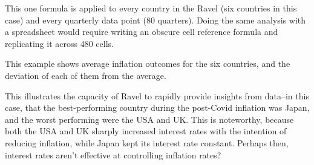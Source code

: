 
This one formula is applied to every country in the Ravel (six countries
in this case) and every quarterly data point (80 quarters). Doing
the same analysis with a spreadsheet would require writing an obscure
cell reference formula and replicating it across 480 cells.

This example shows average inflation outcomes for the six countries,
and the deviation of each of them from the average.
\begin{center}
\par\end{center}

This illustrates the capacity of Ravel to rapidly provide insights
from data--in this case, that the best-performing country during
the post-Covid inflation was Japan, and the worst performing were
the USA and UK. This is noteworthy, because both the USA and UK sharply
increased interest rates with the intention of reducing inflation,
while Japan kept its interest rate constant. Perhaps then, interest
rates aren't effective at controlling inflation rates? 

